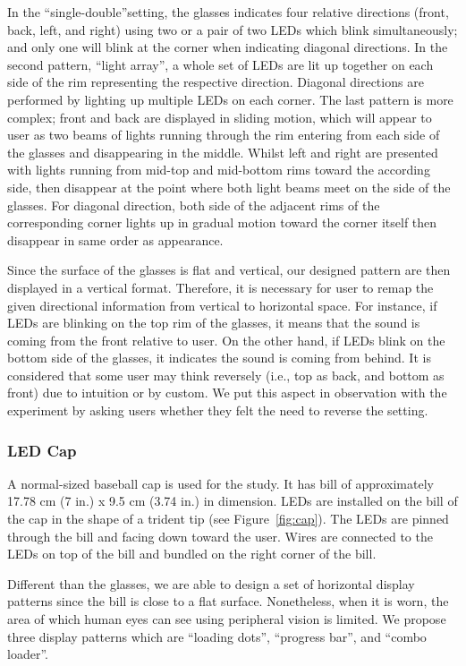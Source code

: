 \documentclass{sigchi}
\begin{document}
In the \textquotedblleft single-double\textquotedblright setting, the glasses indicates four relative directions (front, back, left, and right) using two or a pair of two LEDs which blink simultaneously; and only one will blink at the corner when indicating diagonal directions. In the second pattern, \textquotedblleft light array\textquotedblright, a whole set of LEDs are lit up together on each side of the rim representing the respective direction. Diagonal directions are performed by lighting up multiple LEDs on each corner. The last pattern is more complex; front and back are displayed in sliding motion, which will appear to user as two beams of lights running through the rim entering from each side of the glasses and disappearing in the middle. Whilst left and right are presented with lights running from mid-top and mid-bottom rims toward the according side, then disappear at the point where both light beams meet on the side of the glasses. For diagonal direction, both side of the adjacent rims of the corresponding corner lights up in gradual motion toward the corner itself then disappear in same order as appearance.

Since the surface of the glasses is flat and vertical, our designed pattern are then displayed in a vertical format. Therefore, it is necessary for user to remap the given directional information from vertical to horizontal space. For instance, if LEDs are blinking on the top rim of the glasses, it means that the sound is coming from the front relative to user. On the other hand, if LEDs blink on the bottom side of the glasses, it indicates the sound is coming from behind. It is considered that some user may think reversely (i.e., top as back, and bottom as front) due to intuition or by custom. We put this aspect in observation with the experiment by asking users whether they felt the need to reverse the setting.

\subsubsection{LED Cap}
A normal-sized baseball cap is used for the study. It has bill of approximately 17.78 cm (7 in.) x 9.5 cm (3.74 in.) in dimension. LEDs are installed on the bill of the cap in the shape of a trident tip (see Figure~\ref{fig:cap}). The LEDs are pinned through the bill and facing down toward the user. Wires are connected to the LEDs on top of the bill and bundled on the right corner of the bill.

Different than the glasses, we are able to design a set of horizontal display patterns since the bill is close to a flat surface. Nonetheless, when it is worn, the area of which human eyes can see using peripheral vision is limited. We propose three display patterns which are \textquotedblleft loading dots\textquotedblright, \textquotedblleft progress bar\textquotedblright, and \textquotedblleft combo loader\textquotedblright.
\end{document}
